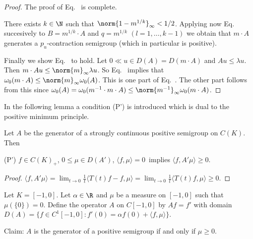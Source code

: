 \begin{proof}
The proof of Eq.~ is complete.

There exists $k \in \N$ such that $\norm{1 - m^{1/k}}_{\infty} < 1/2$.
Applying now Eq.~ 
succesively to $B = m^{1/k} \cdot A$ and $q = m^{1/k}$ $(l = 1, \ldots, k-1)$ we obtain that $m \cdot A$ generates a $p_{u}$-contraction semigroup (which in particular is positive).

Finally we show Eq.~ 
to hold.
Let $0 \ll u \in D(A) = D(m \cdot A)$ and $Au \leq \lambda u$.
Then $m \cdot Au \leq \norm{m}_{\infty}\lambda u$.
So Eq.~ 
implies that $\omega_{0}(m \cdot A) \leq \norm{m}_{\infty}\omega_{0}(A)$.
This is one part of Eq.~. 
The other part follows from this since $\omega_{0}(A) = \omega_{0}(m^{-1} \cdot m \cdot A) \leq \norm{m^{-1}}_{\infty} \omega_{0}(m \cdot A)$.
\end{proof}

In the following lemma a condition (P') is introduced which is dual to the positive minimum principle.

\begin{lemma}\label{lem:b2-1.21}
Let $A$ be the generator of a strongly continuous positive semigroup on $C(K)$.
Then 

(P') \quad $f \in C(K)_{+}$,  $0 \leq \mu \in D(A')$,  $\langle f,\mu \rangle = 0$\, implies  $\langle f,A'\mu \rangle \geq 0$.
\end{lemma}

\begin{proof}
$\langle f,A'\mu \rangle = \lim_{t \to 0} \frac{1}{t} \langle T(t)f - f, \mu \rangle = \lim_{t \to 0} \frac{1}{t} \langle T(t)f, \mu \rangle \geq 0$.
\end{proof}

\begin{example}\label{ex:b2-1.22}
Let $K = [-1,0]$.
Let $\alpha \in \R$ and $\mu$ be a measure on $[-1,0]$ such that $\mu(\{0\}) = 0$.
Define the operator $A$ on $C[-1,0]$ by $Af = f'$ with domain $D(A) = \{f \in C^{1}[-1,0] \colon f'(0) = \alpha f(0) + \langle f,\mu \rangle\}$.

Claim: $A$ is the generator of a positive semigroup if and only if\/ $\mu \geq 0$.
\end{example}

